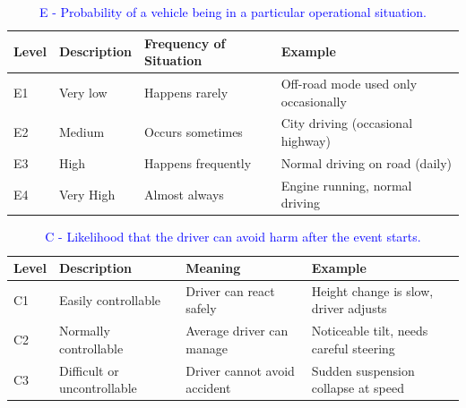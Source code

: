 \begin{solutionblock}
\begin{table}[ht]
    \end{table}

    \begin{table}[ht]
        \centering
        \begin{tabular}{ | m{5em} | m{4cm}| m{5cm} | m{5cm} |}
            \hline
            Level & Description & Frequency of Situation & Example \\
            \hline \hline
            E1 & Very low & Happens rarely & Off-road mode used only occasionally\\
            E2 & Medium & Occurs sometimes & City driving (occasional highway)\\
            E3 & High & Happens frequently & Normal driving on road (daily)\\
            E4 & Very High & Almost always & Engine running, normal driving\\
            \hline
        \end{tabular}
        \caption{\textcolor{blue}{ E - Probability of a vehicle being in a particular operational situation.}}
    \end{table}

    \begin{table}[ht]
        \centering
        \begin{tabular}{ | m{5em} | m{4cm}| m{5cm} | m{5cm} |}
            \hline
            Level & Description & Meaning & Example \\
            \hline \hline
            C1 & Easily controllable & Driver can react safely & Height change is slow, driver adjusts\\
            C2 & Normally controllable & Average driver can manage & Noticeable tilt, needs careful steering\\
            C3 & Difficult or uncontrollable & Driver cannot avoid accident & Sudden suspension collapse at speed\\
            \hline
        \end{tabular}
        \caption{\textcolor{blue}{ C - Likelihood that the driver can avoid harm after the event starts.}}
    \end{table}


\end{solutionblock}
